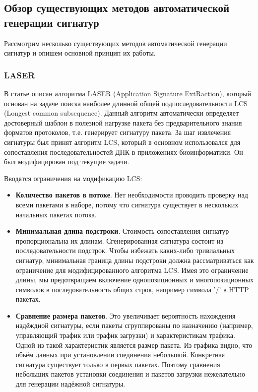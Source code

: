 \subsection{Обзор существующих методов автоматической генерации сигнатур}

Рассмотрим несколько существующих методов автоматической генерации сигнатур и опишем основной принцип их работы.

\subsubsection{LASER}

В статье \cite{park2008towards} описан алгоритма LASER (Application Signature ExtRaction),
который основан на задаче поиска наиболее длинной общей подпоследовательности LCS (Longest common subsequence).
Данный алгоритм автоматически определяет достоверный шаблон в полезной нагрузке пакета без предварительного знания форматов протоколов, т.е. генерирует сигнатуру пакета.
За шаг извлечения сигнатуры был принят алгоритм LCS, который в основном использовался для сопоставления последовательностей ДНК в приложениях биоинформатики.
Он был модифицирован под текущие задачи.

Вводятся ограничения на модификацию LCS:

\begin{itemize}
    \item \textbf{Количество пакетов в потоке}.
    Нет необходимости проводить проверку над всеми пакетами в наборе,
    потому что сигнатура существует в нескольких начальных пакетах потока.
    \item \textbf{Минимальная длина подстроки}. Стоимость сопоставления сигнатур пропорциональна их длинам.
    Сгенерированная сигнатура состоит из последовательности подстрок.
    Чтобы избежать каких-либо тривиальных сигнатур,
    минимальная граница длины подстроки должна рассматриваться как ограничение для модифицированного алгоритма LCS.
    Имея это ограничение длины, мы предотвращаем включение однопозиционных и многопозиционных символов в последовательность общих строк,
    например символа '/' в HTTP пакетах.
    \item \textbf{Сравнение размера пакетов}. Это увеличивает вероятность нахождения надёждной сигнатуры,
    если пакеты сгруппированы по назначению (например, управляющий трафик или трафик загрузки) и характеристикам трафика.
    Одной из такой характеристик является размер пакета.
    Из графика видно, что обьём данных при установлении соединения небольшой. Конкретная сигнатура существует только в первых пакетах.
    Поэтому сравнения небольших пакетов установки соединения и пакетов загрузки нежелательно для генерации надёжной сигнатуры.

\end{itemize}

